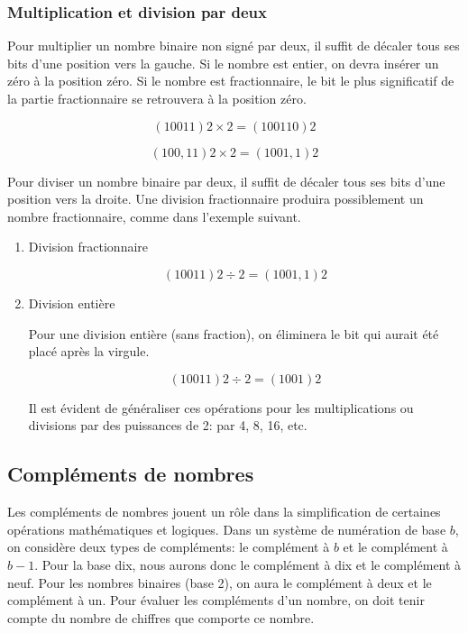 \documentclass[11pt]{article}
\begin{document}
\subsubsection{Multiplication et division par deux}
\label{sec:org29aceb5}

Pour multiplier un nombre binaire non signé par deux, il suffit de
décaler tous ses bits d'une position vers la gauche. Si le nombre est
entier, on devra insérer un zéro à la position zéro. Si le nombre est
fractionnaire, le bit le plus significatif de la partie fractionnaire se
retrouvera à la position zéro.

$$ (10011)2 \times 2 = (100110)2 $$

$$ (100,11)2 \times 2 = (1001,1)2 $$

Pour diviser un nombre binaire par deux, il suffit de décaler tous ses
bits d'une position vers la droite. Une division fractionnaire
produira possiblement un nombre fractionnaire, comme dans l'exemple
suivant.

\begin{enumerate}
\item Division fractionnaire
\label{sec:orgfe39685}

$$ (10011)2 \div 2 = (1001,1)2 $$

\item Division entière
\label{sec:orge551d59}

Pour une division entière (sans fraction), on éliminera le bit qui
aurait été placé après la virgule.

$$ (10011)2 \div 2 = (1001)2 $$

Il est évident de généraliser ces opérations pour les multiplications
ou divisions par des puissances de 2: par 4, 8, 16, etc.
\end{enumerate}

\subsection{Compléments de nombres}
\label{sec:org37d0eee}

Les compléments de nombres jouent un rôle dans la simplification de
certaines opérations mathématiques et logiques. Dans un système de
numération de base \(b\), on considère deux types de compléments: le
complément à \(b\) et le complément à \(b-1\). Pour la base dix, nous
aurons donc le complément à dix et le complément à neuf. Pour les
nombres binaires (base 2), on aura le complément à deux et le
complément à un.  Pour évaluer les compléments d'un nombre, on doit
tenir compte du nombre de chiffres que comporte ce nombre.
\end{document}
